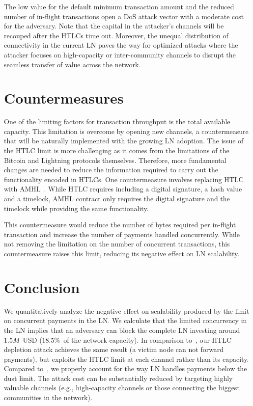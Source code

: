 The low value for the default minimum transaction amount and the reduced number of in-flight transactions open a DoS attack vector with a moderate cost for the adversary.
Note that the capital in the attacker's channels will be recouped after the HTLCs time out.
Moreover, the unequal distribution of connectivity in the current LN paves the way for optimized attacks where the attacker focuses on high-capacity or inter-community channels to disrupt the seamless transfer of value across the network.


\section{Countermeasures}
One of the limiting factors for transaction throughput is the total available capacity.
This limitation is overcome by opening new channels, a countermeasure that will be naturally implemented with the growing LN adoption.
The issue of the HTLC limit is more challenging as it comes from the limitations of the Bitcoin and Lightning protocols themselves.
Therefore, more fundamental changes are needed to reduce the information required to carry out the functionality encoded in HTLCs.
One countermeasure involves replacing HTLC with AMHL~\cite{Malavolta2019}.
While HTLC requires including a digital signature, a hash value and a timelock, AMHL contract only requires the digital signature and the timelock while providing the same functionality.

This countermeasure would reduce the number of bytes required per in-flight transaction and increase the number of payments handled concurrently.
While not removing the limitation on the number of concurrent transactions, this countermeasure raises this limit, reducing its negative effect on LN scalability.


\section{Conclusion}

We quantitatively analyze the negative effect on scalability produced by the limit on concurrent payments in the LN\@.
We calculate that the limited concurrency in the LN implies that an adversary can block the complete LN investing around $1.5M$~USD ($18.5\%$~of the network capacity).
In comparison to~\cite{PerezSola2019}, our HTLC depletion attack achieves the same result (a victim node can not forward payments), but exploits the HTLC limit at each channel rather than its capacity.
Compared to~\cite{Mizrahi2020}, we properly account for the way LN handles payments below the dust limit.
The attack cost can be substantially reduced by targeting highly valuable channels (e.g., high-capacity channels or those connecting the biggest communities in the network).